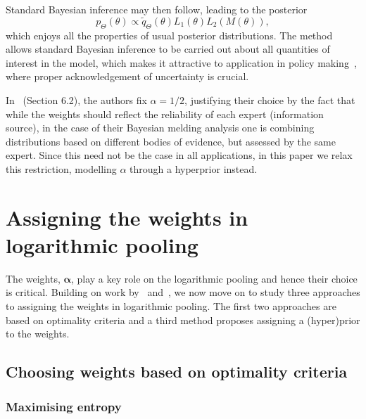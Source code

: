 \documentclass[a4paper, notitlepage, 10pt]{article}
\begin{document}
Standard Bayesian inference may then follow,  leading to the posterior
\begin{equation}
 \label{eq:BMpoolposterior}
 p_{\Theta}(\theta) \propto \tilde{q}_{\Theta}(\theta) L_1(\theta) L_2(M(\theta)),
\end{equation}
which enjoys all the properties of usual posterior distributions.
The method allows standard Bayesian inference to be carried out about all quantities of interest in the model, which makes it attractive to application in policy making~\citep{Alkema2008}, where proper acknowledgement of uncertainty is crucial.

In~\cite{Poole2000} (Section 6.2), the authors fix $\alpha = 1/2$, justifying their choice by the fact that while the weights should reflect the reliability of each expert (information source), in the case of their Bayesian melding analysis one is combining distributions based on different bodies of evidence, but assessed by the same expert.
Since this need not be the case in all applications, in this paper we relax this restriction, modelling $\alpha$ through a hyperprior instead. 

\section{Assigning the weights in logarithmic pooling}
\label{sec:weights}

The weights, $\boldsymbol \alpha$, play a key role on the logarithmic pooling and hence their choice is critical.
Building on work by~\cite{Poole2000,Rufo2012A,Rufo2012B} and~\cite{Abbas2009}, we now move on to study three approaches to assigning the weights in logarithmic pooling.
The first two approaches are based on optimality criteria and a third method proposes assigning a (hyper)prior to the weights.

\subsection{Choosing weights based on optimality criteria}

\subsubsection{Maximising entropy}
\label{sec:maxent}
\end{document}
